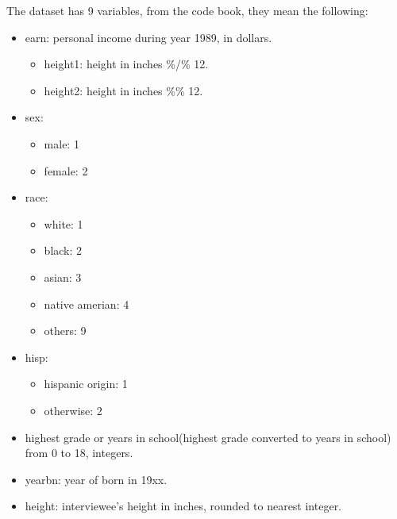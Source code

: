 \documentclass[]{article}
\newenvironment{Shaded}{\begin{snugshade}}{\end{snugshade}}
\newcommand{\CommentTok}[1]{\textcolor[rgb]{0.56,0.35,0.01}{\textit{#1}}}
\newcommand{\DecValTok}[1]{\textcolor[rgb]{0.00,0.00,0.81}{#1}}
\newcommand{\KeywordTok}[1]{\textcolor[rgb]{0.13,0.29,0.53}{\textbf{#1}}}
\newcommand{\NormalTok}[1]{#1}
\newcommand{\OperatorTok}[1]{\textcolor[rgb]{0.81,0.36,0.00}{\textbf{#1}}}
\newcommand{\StringTok}[1]{\textcolor[rgb]{0.31,0.60,0.02}{#1}}
\providecommand{\tightlist}{%
  \setlength{\itemsep}{0pt}\setlength{\parskip}{0pt}}
\begin{document}
The dataset has 9 variables, from the code book, they mean the
following:

\begin{itemize}
\item
  earn: personal income during year 1989, in dollars.

  \begin{itemize}
  \tightlist
  \item
    height1: height in inches \%/\% 12.
  \item
    height2: height in inches \%\% 12.
  \end{itemize}
\item
  sex:

  \begin{itemize}
  \tightlist
  \item
    male: 1
  \item
    female: 2
  \end{itemize}
\item
  race:

  \begin{itemize}
  \tightlist
  \item
    white: 1
  \item
    black: 2
  \item
    asian: 3
  \item
    native amerian: 4
  \item
    others: 9
  \end{itemize}
\item
  hisp:

  \begin{itemize}
  \tightlist
  \item
    hispanic origin: 1
  \item
    otherwise: 2
  \end{itemize}
\item
  highest grade or years in school(highest grade converted to years in
  school) from 0 to 18, integers.
\item
  yearbn: year of born in 19xx.
\item
  height: interviewee's height in inches, rounded to nearest integer.
\end{itemize}

\newline

\begin{Shaded}
\end{Shaded}
\end{document}
